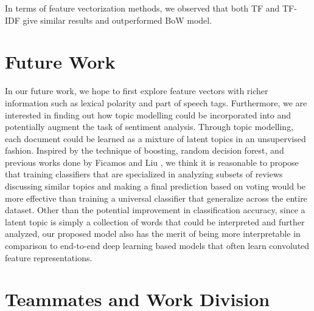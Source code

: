 \documentclass{article}
\begin{document}
In terms of feature vectorization methods, we observed that both TF and TF-IDF give similar results and outperformed BoW model.


\section{Future Work}

In our future work, we hope to first explore feature vectors with richer information such as lexical polarity and part of speech tags. Furthermore, we are interested in finding out how topic modelling could be incorporated into and potentially augment the task of sentiment analysis. Through topic modelling, each document could be learned as a mixture of latent topics in an unsupervised fashion. Inspired by the technique of boosting, random decision forest, and previous works done by Ficamos and Liu \cite{Ficamos}, we think it is reasonable to propose that training classifiers that are specialized in analyzing subsets of reviews discussing similar topics and making a final prediction based on voting would be more effective than training a universal classifier that generalize across the entire dataset. Other than the potential improvement in classification accuracy, since a latent topic is simply a collection of words that could be interpreted and further analyzed, our proposed model also has the merit of being more interpretable in comparison to end-to-end deep learning based models that often learn convoluted feature representations. 


\section{Teammates and Work Division}
\end{document}
